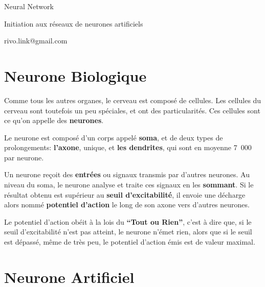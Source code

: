 \documentclass{article}
\begin{document}
\vspace*{\fill}
\begingroup
\centering

Neural Network

\vspace{3mm}
Initiation aux réseaux de neurones artificiels

\vspace{5mm} 
rivo.link@gmail.com

\endgroup
\vspace*{\fill}

\newpage

\section{Neurone Biologique}

Comme tous les autres organes, le cerveau est composé de cellules. Les cellules du cerveau sont toutefois un peu spéciales, et ont des particularités. Ces cellules sont ce qu'on appelle des \textbf{neurones}.
\newline

Le neurone est composé d'un corps appelé \textbf{soma}, et de deux types de prolongements: \textbf{l'axone}, unique, et \textbf{les dendrites}, qui sont en moyenne 7 000 par neurone.
\newline

Un neurone reçoit des \textbf{entrées} ou signaux transmis par d’autres neurones. Au niveau du soma, le neurone analyse et traite ces signaux en les \textbf{sommant}. Si le résultat obtenu est supérieur au \textbf{seuil d'excitabilité}, il envoie une décharge alors nommé \textbf{potentiel d'action} le long de son axone vers d'autres neurones.
\newline

Le potentiel d'action obéit à la lois du \textbf{``Tout ou Rien''}, c'est à dire que, si le seuil d'excitabilité n'est pas atteint, le neurone n'émet rien, alors que si le seuil est dépassé, même de très peu, le potentiel d'action émis est de valeur maximal.

\section{Neurone Artificiel}
\end{document}
